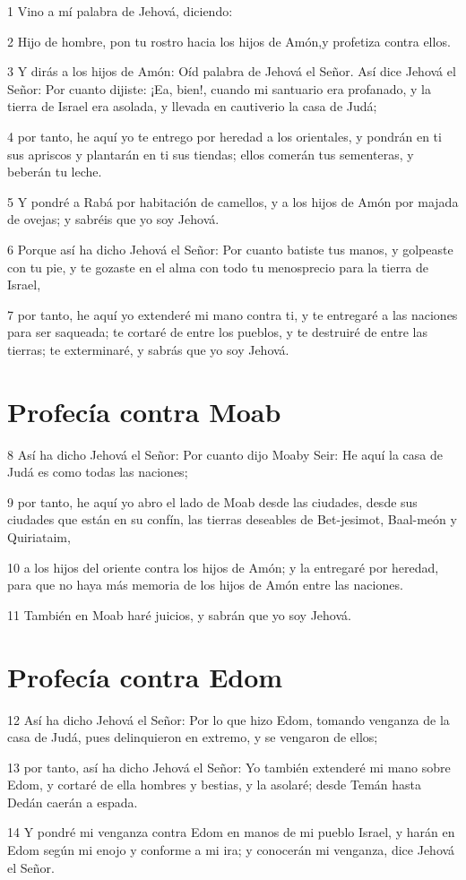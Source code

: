 \par 1 Vino a mí palabra de Jehová, diciendo:
\par 2 Hijo de hombre, pon tu rostro hacia los hijos de Amón,y profetiza contra ellos.
\par 3 Y dirás a los hijos de Amón: Oíd palabra de Jehová el Señor. Así dice Jehová el Señor: Por cuanto dijiste: ¡Ea, bien!, cuando mi santuario era profanado, y la tierra de Israel era asolada, y llevada en cautiverio la casa de Judá; 
\par 4 por tanto, he aquí yo te entrego por heredad a los orientales, y pondrán en ti sus apriscos y plantarán en ti sus tiendas; ellos comerán tus sementeras, y beberán tu leche.
\par 5 Y pondré a Rabá por habitación de camellos, y a los hijos de Amón por majada de ovejas; y sabréis que yo soy Jehová.
\par 6 Porque así ha dicho Jehová el Señor: Por cuanto batiste tus manos, y golpeaste con tu pie, y te gozaste en el alma con todo tu menosprecio para la tierra de Israel,
\par 7 por tanto, he aquí yo extenderé mi mano contra ti, y te entregaré a las naciones para ser saqueada; te cortaré de entre los pueblos, y te destruiré de entre las tierras; te exterminaré, y sabrás que yo soy Jehová.

\section*{Profecía contra Moab}

\par 8 Así ha dicho Jehová el Señor: Por cuanto dijo Moaby Seir: He aquí la casa de Judá es como todas las naciones;
\par 9 por tanto, he aquí yo abro el lado de Moab desde las ciudades, desde sus ciudades que están en su confín, las tierras deseables de Bet-jesimot, Baal-meón y Quiriataim,
\par 10 a los hijos del oriente contra los hijos de Amón; y la entregaré por heredad, para que no haya más memoria de los hijos de Amón entre las naciones.
\par 11 También en Moab haré juicios, y sabrán que yo soy Jehová.

\section*{Profecía contra Edom}

\par 12 Así ha dicho Jehová el Señor: Por lo que hizo Edom, tomando venganza de la casa de Judá, pues delinquieron en extremo, y se vengaron de ellos;
\par 13 por tanto, así ha dicho Jehová el Señor: Yo también extenderé mi mano sobre Edom, y cortaré de ella hombres y bestias, y la asolaré; desde Temán hasta Dedán caerán a espada.
\par 14 Y pondré mi venganza contra Edom en manos de mi pueblo Israel, y harán en Edom según mi enojo y conforme a mi ira; y conocerán mi venganza, dice Jehová el Señor.

